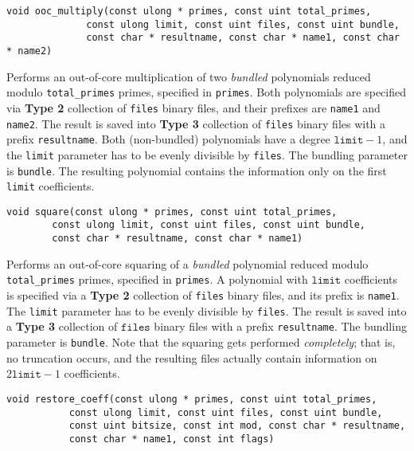 \documentclass[a4paper,10pt]{article}
\newcommand{\code}{\lstinline}
\begin{document}
\begin{lstlisting}
void ooc_multiply(const ulong * primes, const uint total_primes,
	          const ulong limit, const uint files, const uint bundle,
	          const char * resultname, const char * name1, const char * name2)
\end{lstlisting}

Performs an out-of-core multiplication of two \emph{bundled} polynomials reduced modulo \code{total_primes} primes, specified in \code{primes}. Both polynomials are specified via \textbf{Type 2} collection of \code{files} binary files, and their prefixes are \code{name1} and \code{name2}. The result is saved into \textbf{Type 3} collection of \code{files} binary files with a prefix \code{resultname}. Both (non-bundled) polynomials have a degree $\texttt{limit} - 1$, and the \code{limit} parameter has to be evenly divisible by \code{files}. The bundling parameter is \code{bundle}. The resulting polynomial contains the information only on the first \code{limit} coefficients.

\begin{lstlisting}
void square(const ulong * primes, const uint total_primes,
	    const ulong limit, const uint files, const uint bundle,
	    const char * resultname, const char * name1)
\end{lstlisting}

Performs an out-of-core squaring of a \emph{bundled} polynomial reduced modulo \code{total_primes} primes, specified in \code{primes}. A polynomial with $\texttt{limit}$ coefficients is specified via a \textbf{Type 2} collection of \code{files} binary files, and its prefix is \code{name1}. The \code{limit} parameter has to be evenly divisible by \code{files}. The result is saved into a \textbf{Type 3} collection of $\texttt{files}$ binary files with a prefix \code{resultname}. The bundling parameter is \code{bundle}. Note that the squaring gets performed \emph{completely}; that is, no truncation occurs, and the resulting files actually contain information on $2\texttt{limit}-1$ coefficients.

\begin{lstlisting}
void restore_coeff(const ulong * primes, const uint total_primes,
		   const ulong limit, const uint files, const uint bundle,
		   const uint bitsize, const int mod, const char * resultname,
		   const char * name1, const int flags)
\end{lstlisting}
\end{document}
